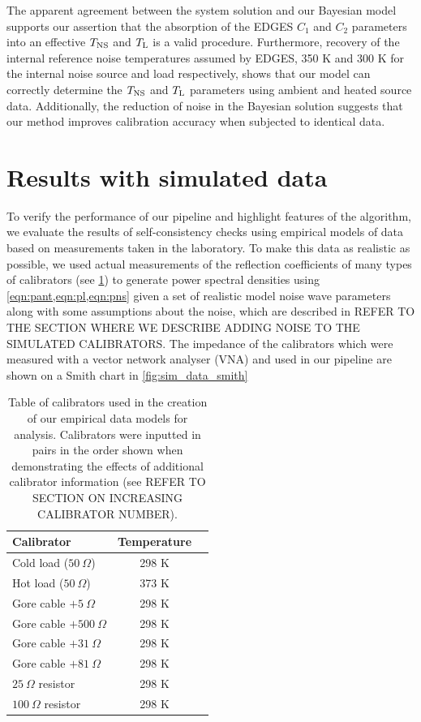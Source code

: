 The apparent agreement between the system solution and our Bayesian model supports our assertion that the absorption of the EDGES $C_1$ and $C_2$ parameters into an effective $T_{\mathrm{NS}}$ and $T_{\mathrm{L}}$ is a valid procedure. Furthermore, recovery of the internal reference noise temperatures assumed by EDGES, 350 K and 300 K for the internal noise source and load respectively, shows that our model can correctly determine the $T_{\mathrm{NS}}$ and $T_{\mathrm{L}}$ parameters using ambient and heated source data. Additionally, the reduction of noise in the Bayesian solution suggests that our method improves calibration accuracy when subjected to identical data. 


\section{Results with simulated data}\label{sec:simulated_data}
To verify the performance of our pipeline and highlight features of the algorithm, we evaluate the results of self-consistency checks using empirical models of data based on measurements taken in the laboratory. To make this data as realistic as possible, we used actual measurements of the reflection coefficients of many types of calibrators (see \cref{tab:sim_calibrators}) to generate power spectral densities using \cref{eqn:pant,eqn:pl,eqn:pns} given a set of realistic model noise wave parameters along with some assumptions about the noise, which are described in REFER TO THE SECTION WHERE WE DESCRIBE ADDING NOISE TO THE SIMULATED CALIBRATORS. The impedance of the calibrators which were measured with a vector network analyser (VNA) and used in our pipeline are shown on a Smith chart in \cref{fig:sim_data_smith}
\begin{table}
    \centering
    \begin{tabular}{lcc}
    \hline
    Calibrator & Temperature\\
    \hline
    Cold load ($50 \ \Omega$) & 298 K\\
    Hot load ($50 \ \Omega$) & 373 K\\
    Gore cable $+ 5 \ \Omega$ & 298 K\\
    Gore cable $+ 500 \ \Omega$ & 298 K\\
    Gore cable $+ 31 \ \Omega$ & 298 K\\
    Gore cable $+ 81 \ \Omega$ & 298 K\\
    $25 \ \Omega$ resistor & 298 K\\
    $100 \ \Omega$ resistor & 298 K\\
    \hline
    \end{tabular}
    \caption{Table of calibrators used in the creation of our empirical data models for analysis. Calibrators were inputted in pairs in the order shown when demonstrating the effects of additional calibrator information (see REFER TO SECTION ON INCREASING CALIBRATOR NUMBER).}
    \label{tab:sim_calibrators}
\end{table}

